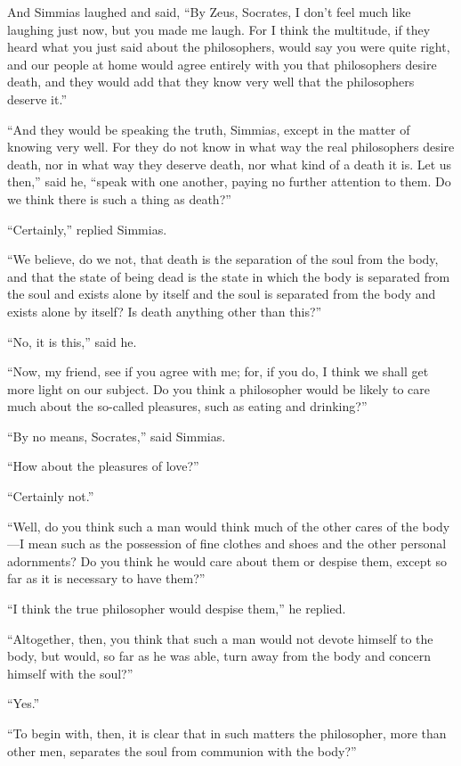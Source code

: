 \documentclass[letterpaper,12pt]{article}
\newcommand{\stephpag}[1]{\marginnote{\small\itshape\fontfamily{ppl}\selectfont #1}}
\begin{document}
\begin{drama}
And Simmias laughed and said, ``By Zeus, \stephpag{b} Socrates, I don't feel much like laughing just now, but you made me laugh. For I think the multitude, if they heard what you just said about the philosophers, would say you were quite right, and our people at home would agree entirely with you that philosophers desire death, and they would add that they know very well that the philosophers deserve it.''
 
``And they would be speaking the truth, Simmias, except in the matter of knowing very well. For they do not know in what way the real philosophers desire death, nor in what way they deserve death, nor what kind of a death it is. \stephpag{c} Let us then,'' said he, ``speak with one another, paying no further attention to them. Do we think there is such a thing as death?''
 
``Certainly,'' replied Simmias.
 
``We believe, do we not, that death is the separation of the soul from the body, and that the state of being dead is the state in which the body is separated from the soul and exists alone by itself and the soul is separated from the body and exists alone by itself? Is death anything other than this?''
 
``No, it is this,'' said he.
 
``Now, my friend, see if you agree with me; \stephpag{d} for, if you do, I think we shall get more light on our subject. Do you think a philosopher would be likely to care much about the so-called pleasures, such as eating and drinking?''
 
``By no means, Socrates,'' said Simmias.
 
``How about the pleasures of love?''
 
``Certainly not.''
 
``Well, do you think such a man would think much of the other cares of the body---I mean such as the possession of fine clothes and shoes and the other personal adornments? Do you think he would care about them \stephpag{e} or despise them, except so far as it is necessary to have them?''
 
``I think the true philosopher would despise them,'' he replied.
 
``Altogether, then, you think that such a man would not devote himself to the body, but would, so far as he was able, turn away from the body and concern himself with the soul?''
 
``Yes.''
 
``To begin with, then, it is clear that in such matters the philosopher, more than other men, separates \stephpag{65 a} the soul from communion with the body?''
 

\end{drama}
\end{document}
